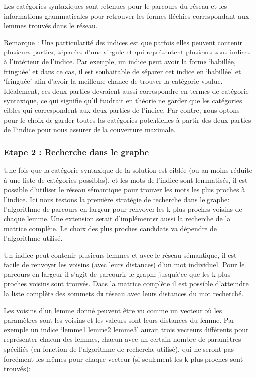 Les catégories syntaxiques sont retenues pour le parcours du réseau et les informations grammaticales pour retrouver les formes fléchies correspondant aux lemmes trouvés dans le réseau.

Remarque : Une particularité des indices est que parfois elles peuvent contenir plusieurs parties, séparées d'une virgule et qui représentent plusieurs sous-indices à l'intérieur de l'indice. Par exemple, un indice peut avoir la forme \lq{habillée, fringuée}\rq{} et dans ce cas, il est souhaitable de séparer cet indice en \lq{habillée}\rq{} et \lq{fringuée}\rq{} afin d'avoir la meilleure chance de trouver la catégorie voulue. Idéalement, ces deux parties devraient aussi correspondre en termes de catégorie syntaxique, ce qui signifie qu'il faudrait en théorie ne garder que les catégories cibles qui correspondent aux deux parties de l'indice. Par contre, nous optons pour le choix de garder toutes les catégories potentielles à partir des deux parties de l'indice pour nous assurer de la couverture maximale. 

\subsubsection{Etape 2 : Recherche dans le graphe}%

Une fois que la catégorie syntaxique de la solution est ciblée (ou au moins 
réduite à une liste de catégories possibles), et les mots de l'indice sont 
lemmatisés, il est possible d'utiliser le réseau sémantique pour trouver les 
mots les plus proches à l'indice. Ici nous testons la première stratégie de 
recherche dans le graphe: l'algorithme de parcours en largeur pour renvoyer les 
k plus proches voisins de chaque lemme. Une extension serait d'implémenter aussi 
la recherche de la matrice complète. Le choix des plus proches candidats va 
dépendre de l'algorithme utilisé.

Un indice peut contenir plusieurs lemmes et avec le réseau sémantique, il est facile de renvoyer les voisins (avec leurs distances) d'un mot individuel. Pour le parcours en largeur il s'agit de parcourir le graphe jusquà'ce que les k plus proches voisins sont trouvés. Dans la matrice complète il est possible d'atteindre la liste complète des sommets du réseau avec leurs distances du mot recherché. 

Les voisins d'un lemme donné peuvent être vu comme un vecteur où les paramètres sont les voisins et les valeurs sont leurs distances du lemme. Par exemple un indice \lq{lemme1 lemme2 lemme3}\rq{} aurait trois vecteurs différents pour représenter chacun des lemmes, chacun avec un certain nombre de paramètres spécifiés (en fonction de l'algorithme de recherche utilisé), qui ne seront pas forcément les mêmes pour chaque vecteur (si seulement les k plus proches sont trouvés):

